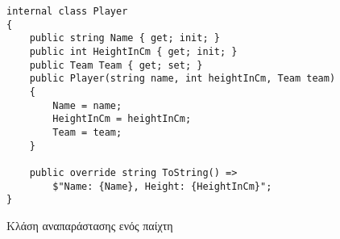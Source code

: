 \begin{listing}[htbp]
\begin{verbatim}
internal class Player
{
    public string Name { get; init; }
    public int HeightInCm { get; init; }
    public Team Team { get; set; }
    public Player(string name, int heightInCm, Team team)
    {
        Name = name;
        HeightInCm = heightInCm;
        Team = team;
    }

    public override string ToString() =>
        $"Name: {Name}, Height: {HeightInCm}";
}
\end{verbatim}
\caption{Κλάση αναπαράστασης ενός παίχτη}
\label{delegPlayer}
\end{listing}